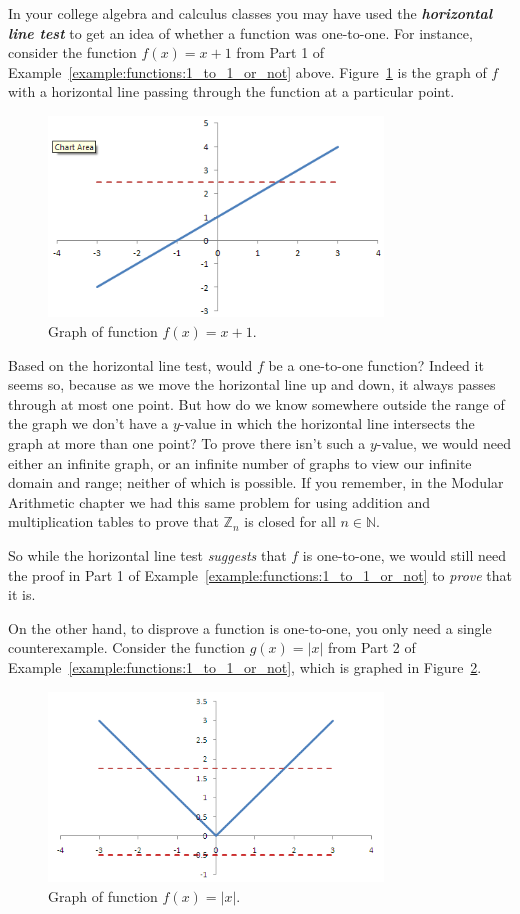 \begin{rem}\label{rem:onetoone}
In your college algebra and calculus classes you may have used the \textbf{\emph{horizontal line test}} to get an idea of whether a function was one-to-one.  For instance, consider the function $f(x)=x +1$ from Part 1 of Example~\ref{example:functions:1_to_1_or_not} above.  Figure~\ref{fig:xplus1} is the graph of $f$ with a horizontal line passing through the function at a particular point.
\begin{figure}[h]
\includegraphics[width=3.5in]{images/xplus1.png}
\caption{Graph of function $f(x)=x +1$.}
\label{fig:xplus1}
\end{figure}

Based on the horizontal line test, would $f$ be a one-to-one function?  Indeed it seems so, because as we move the horizontal line up and down, it always passes through at most one point.  But how do we know somewhere outside the range of the graph we don't have a $y$-value in which the horizontal line intersects the graph at more than one point?  To prove there isn't such a $y$-value, we would need either an infinite graph, or an infinite number of graphs to view our infinite domain and range; neither of which is possible.  If you remember, in the Modular Arithmetic chapter we had this same problem for using addition and multiplication tables to prove that ${\mathbb Z}_n$ is closed for all $n \in {\mathbb N}$.   

So while the horizontal line test \emph{suggests} that $f$ is one-to-one, we would still need the proof in Part 1 of Example~\ref{example:functions:1_to_1_or_not} to \emph{prove} that it is.

On the other hand, to disprove a function is one-to-one, you only need a single counterexample.  Consider the function $g(x)= |x|$ from Part 2 of Example~\ref{example:functions:1_to_1_or_not}, which is graphed in Figure~\ref{fig:absx}.
\begin{figure}[h]
\includegraphics[width=3.5in]{images/absx.png}
\caption{Graph of function $f(x)=|x|$.}
\label{fig:absx}
\end{figure}


\end{rem}
